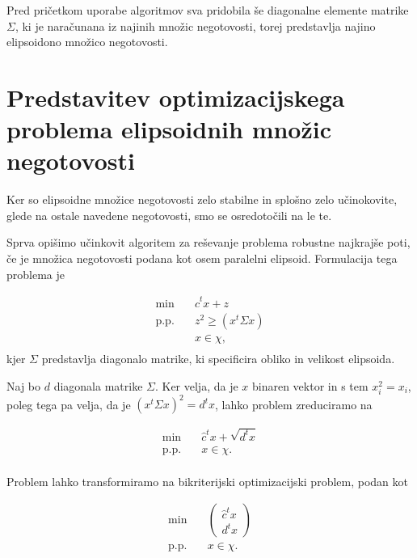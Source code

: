 \documentclass[a4paper, 12 pt]{article}
\theoremstyle{definition} %
\theoremstyle{plain} %
\theoremstyle{definition}
\begin{document}
Pred pričetkom uporabe algoritmov sva pridobila še diagonalne elemente matrike $\Sigma$, ki je naračunana iz najinih množic negotovosti, torej predstavlja najino elipsoidono množico negotovosti.


\section{Predstavitev optimizacijskega problema elipsoidnih množic negotovosti}
Ker so elipsoidne množice negotovosti zelo stabilne in splošno zelo učinokovite, glede na ostale navedene negotovosti, smo se osredotočili na le te.

Sprva opišimo učinkovit algoritem za reševanje problema robustne najkrajše poti, če je množica negotovosti podana kot osem paralelni elipsoid. Formulacija tega problema je

\begin{equation*}
\begin{aligned}
\min \quad &  \hat{c}^t x + z\\
\textrm{p.p.} \quad & {z}^2 \geq (x^t \Sigma x )\\
& x \in \chi,\\
\end{aligned}
\end{equation*}
 kjer $\Sigma$ predstavlja diagonalo matrike, ki specificira obliko in velikost elipsoida. \newline

Naj bo $d$ diagonala matrike $\Sigma$.
Ker velja, da je $x$ binaren vektor in s tem $x_{i}^2=x_{i}$, poleg tega pa velja, da je $(x^t  \Sigma x)^2 = d^tx$, lahko problem zreduciramo na

\begin{equation*}
\begin{aligned}
\min \quad &  \hat{c}^t x +\sqrt{d^tx}\\
\textrm{p.p.} \quad & x \in \chi.\\
\end{aligned}
\end{equation*}

Problem lahko transformiramo na bikriterijski optimizacijski problem, podan kot

\begin{equation*}
\begin{aligned}
\min \quad &  \begin{pmatrix} \hat{c}^t x \\ d^tx \end{pmatrix} \\
\textrm{p.p.} \quad & x \in \chi.\\
\end{aligned}
\end{equation*}
\end{document}
